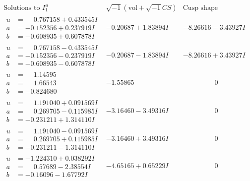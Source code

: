 \documentclass[1p]{elsarticle_modified}
\theoremstyle{definition}
\newcommand{\I}{\sqrt{-1}}
\begin{document}
$$\begin{array}{c|c|c}  
\text{Solutions to }I^u_{1}& \I (\text{vol} + \sqrt{-1}CS) & \text{Cusp shape}\\
 \hline 
\begin{aligned}
u &= \phantom{-}0.767158 + 0.433545 I \\
a &= -0.152356 + 0.237919 I \\
b &= -0.608935 + 0.607878 I\end{aligned}
 & -0.20687 + 1.83894 I & -8.26616 - 3.43927 I \\ \hline\begin{aligned}
u &= \phantom{-}0.767158 - 0.433545 I \\
a &= -0.152356 - 0.237919 I \\
b &= -0.608935 - 0.607878 I\end{aligned}
 & -0.20687 - 1.83894 I & -8.26616 + 3.43927 I \\ \hline\begin{aligned}
u &= \phantom{-}1.14595\phantom{ +0.000000I} \\
a &= \phantom{-}1.66543\phantom{ +0.000000I} \\
b &= -0.824680\phantom{ +0.000000I}\end{aligned}
 & -1.55865\phantom{ +0.000000I} & \phantom{-0.000000 } 0 \\ \hline\begin{aligned}
u &= \phantom{-}1.191040 + 0.091569 I \\
a &= \phantom{-}0.269705 - 0.115985 I \\
b &= -0.231211 + 1.314110 I\end{aligned}
 & -3.16460 - 3.49316 I & \phantom{-0.000000 } 0 \\ \hline\begin{aligned}
u &= \phantom{-}1.191040 - 0.091569 I \\
a &= \phantom{-}0.269705 + 0.115985 I \\
b &= -0.231211 - 1.314110 I\end{aligned}
 & -3.16460 + 3.49316 I & \phantom{-0.000000 } 0 \\ \hline\begin{aligned}
u &= -1.224310 + 0.038292 I \\
a &= \phantom{-}0.57689 - 2.38554 I \\
b &= -0.16096 - 1.67792 I\end{aligned}
 & -4.65165 + 0.65229 I & \phantom{-0.000000 } 0 \\ \hline\begin{aligned}

\end{aligned}
\end{array}$$
\end{document}

